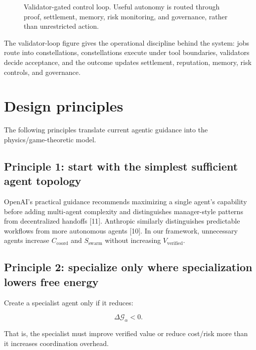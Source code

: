 \documentclass[
  11pt,
]{article}
\begin{document}
\begin{figure}
\centering
\resizebox{0.88\textwidth}{!}{}
\caption{Validator-gated control loop. Useful autonomy is routed through
proof, settlement, memory, risk monitoring, and governance, rather than
unrestricted action.}
\end{figure}

The validator-loop figure gives the operational discipline behind the system: jobs route
into constellations, constellations execute under tool boundaries,
validators decide acceptance, and the outcome updates settlement,
reputation, memory, risk controls, and governance.

\section{Design principles}\label{design-principles}

The following principles translate current agentic guidance into the
physics/game-theoretic model.

\subsection{Principle 1: start with the simplest sufficient agent
topology}\label{principle-1-start-with-the-simplest-sufficient-agent-topology}

OpenAI's practical guidance recommends maximizing a single agent's
capability before adding multi-agent complexity and distinguishes
manager-style patterns from decentralized handoffs {[}11{]}. Anthropic
similarly distinguishes predictable workflows from more autonomous
agents {[}10{]}. In our framework, unnecessary agents increase
\(C_{\text{coord}}\) and \(S_{\text{swarm}}\) without increasing
\(V_{\text{verified}}\).

\subsection{Principle 2: specialize only where specialization lowers
free
energy}\label{principle-2-specialize-only-where-specialization-lowers-free-energy}

Create a specialist agent only if it reduces:

\[
\Delta\mathcal{G}_{\alpha}<0.
\]

That is, the specialist must improve verified value or reduce cost/risk
more than it increases coordination overhead.
\end{document}
